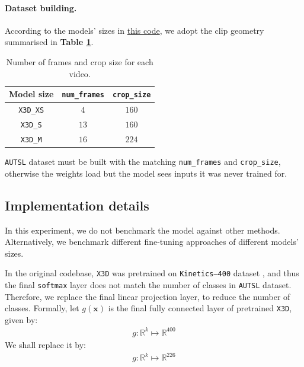 \paragraph{Dataset building.} According to the models' sizes in \href{https://github.com/facebookresearch/pytorchvideo/blob/f3142bb05cdb56af0704ab6f0adfb0c7bbafe4a0/pytorchvideo/models/x3d.py#L539}{this code}, we adopt the clip geometry summarised in \textbf{Table \ref{tab:model_sizes}}.
\begin{table}[H]
    \centering\small
    \begin{tabular}{@{}c c c@{}}
    \toprule
    \textbf{Model size} & \texttt{num\_frames} & \texttt{crop\_size}  \\
    \midrule
    \texttt{X3D\_XS} & $4$ & $160$  \\
    \texttt{X3D\_S} & $13$ & $160$  \\
    \texttt{X3D\_M} & $16$ & $224$  \\
    \bottomrule
    \end{tabular}
    \caption{Number of frames and crop size for each video.}
    \label{tab:model_sizes}
\end{table}
\texttt{AUTSL} dataset must be built with the matching \texttt{num\_frames} and \texttt{crop\_size}, otherwise the weights load but the model sees inputs it was never trained for.

\subsection{Implementation details}
\label{sec:implementation}


In this experiment, we do not benchmark the model against other methods. Alternatively, we benchmark different fine-tuning approaches of different models' sizes.

In the original codebase, \texttt{X3D} was pretrained on \texttt{Kinetics--400} dataset \cite{kay2017kinetics}, and thus the final \texttt{softmax} layer does not match the number of classes in \texttt{AUTSL} dataset.
Therefore, we replace the final linear projection layer, to reduce the number of classes.
Formally, let $g(\mathbf x)$ is the final fully connected layer of pretrained \texttt{X3D}, given by:
\begin{align}
    g: \mathbb R^{k} \mapsto \mathbb R^{400}
\end{align}
We shall replace it by:
\begin{align}
    g: \mathbb R^k \mapsto \mathbb R^{226}
\end{align}

